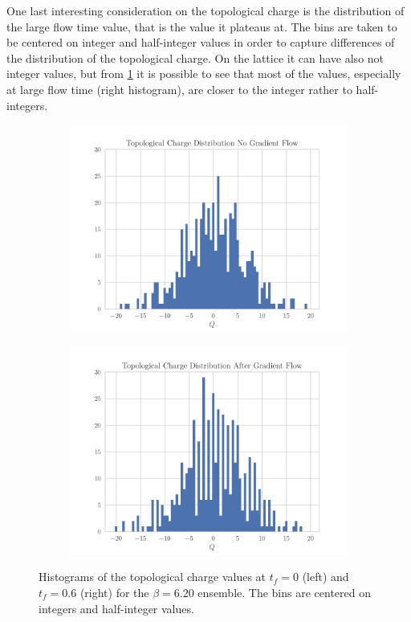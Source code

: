 One last interesting consideration on the topological charge is the distribution of the large flow time value, that is the value it plateaus at. The bins are taken to be centered on integer and half-integer values in order to capture differences of the distribution of the topological charge. On the lattice it can have also not integer values, but from \cref{fig:topchist} it is possible to see that most of the values, especially at large flow time (right histogram), are closer to the integer rather to half-integers.
\begin{figure}[hbt!]
    \centering
    \begin{subfigure}{0.45\textwidth}
        \includegraphics[width=\textwidth]{results/TopcHistNoFlow.pdf}
    \end{subfigure}
    \begin{subfigure}{0.45\textwidth}
        \includegraphics[width=\textwidth]{results/TopcHistFlow.pdf}
    \end{subfigure}
    \caption{\footnotesize Histograms of the topological charge values at $t_f=0$ (left) and $t_f=0.6$ (right) for the $\beta=6.20$ ensemble. The bins are centered on integers and half-integer values.}
    \label{fig:topchist}
\end{figure} 

